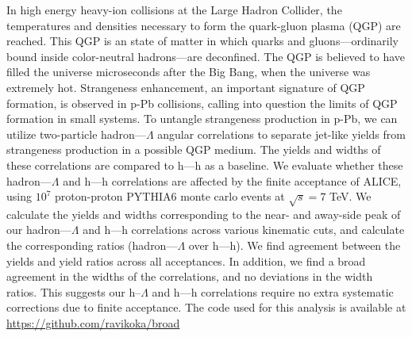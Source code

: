 
\begin{utabstract}
    In high energy heavy-ion collisions at the Large Hadron Collider, the temperatures and densities necessary to form the quark-gluon plasma (QGP) are reached. This QGP is an state of matter in which quarks and gluons---ordinarily bound inside color-neutral hadrons---are deconfined. The QGP is believed to have filled the universe microseconds after the Big Bang, when the universe was extremely hot. Strangeness enhancement, an important signature of QGP formation, is observed in p-Pb collisions, calling into question the limits of QGP formation in small systems. To untangle strangeness production in p-Pb, we can utilize two-particle hadron---$\Lambda$ angular correlations to separate jet-like yields from strangeness production in a possible QGP medium. The yields and widths of these correlations are compared to h---h as a baseline. We evaluate whether these hadron---$\Lambda$ and h---h correlations are affected by the finite acceptance of ALICE, using $10^7$ proton-proton PYTHIA6 monte carlo events at $\sqrt{s}=7$ TeV. We calculate the yields and widths corresponding to the near- and away-side peak of our hadron---$\Lambda$ and h---h correlations across various kinematic cuts, and calculate the corresponding ratios (hadron---$\Lambda$ over h---h). We find agreement between the yields and yield ratios across all acceptances. In addition, we find a broad agreement in the widths of the correlations, and no deviations in the width ratios. This suggests our h--$\Lambda$ and h---h correlations require no extra systematic corrections due to finite acceptance. The code used for this analysis is available at \url{https://github.com/ravikoka/broad}
\end{utabstract}